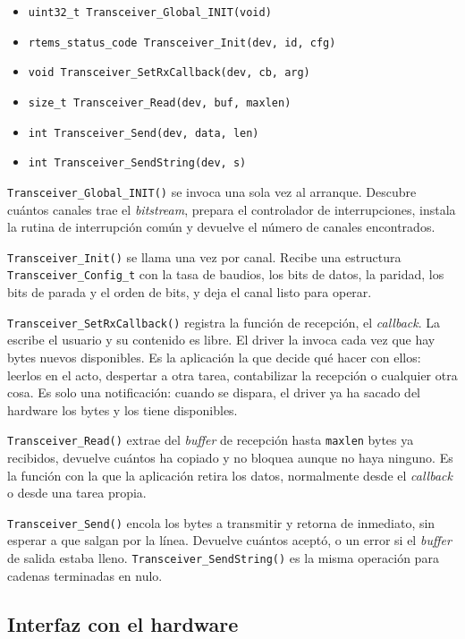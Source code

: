 \begin{itemize}
    \item \texttt{uint32\_t Transceiver\_Global\_INIT(void)}
    \item \texttt{rtems\_status\_code Transceiver\_Init(dev, id, cfg)}
    \item \texttt{void Transceiver\_SetRxCallback(dev, cb, arg)}
    \item \texttt{size\_t Transceiver\_Read(dev, buf, maxlen)}
    \item \texttt{int Transceiver\_Send(dev, data, len)}
    \item \texttt{int Transceiver\_SendString(dev, s)}
\end{itemize}

\texttt{Transceiver\_Global\_INIT()} se invoca una sola vez al arranque. Descubre cuántos canales
trae el \textit{bitstream}, prepara el controlador de interrupciones, instala la rutina de
interrupción común y devuelve el número de canales encontrados.

\texttt{Transceiver\_Init()} se llama una vez por canal. Recibe una estructura
\texttt{Transceiver\_\allowbreak Config\_t} con la tasa de baudios, los bits de datos, la paridad, los bits de
parada y el orden de bits, y deja el canal listo para operar.

\texttt{Transceiver\_SetRxCallback()} registra la función de recepción, el \textit{callback}. La
escribe el usuario y su contenido es libre. El driver la invoca cada vez que hay bytes nuevos
disponibles. Es la aplicación la que decide qué hacer con ellos: leerlos en el acto, despertar a
otra tarea, contabilizar la recepción o cualquier otra cosa. Es solo una notificación: cuando se
dispara, el driver ya ha sacado del hardware los bytes y los tiene disponibles.

\texttt{Transceiver\_Read()} extrae del \textit{buffer} de recepción hasta \texttt{maxlen} bytes ya
recibidos, devuelve cuántos ha copiado y no bloquea aunque no haya ninguno. Es la función con la que
la aplicación retira los datos, normalmente desde el \textit{callback} o desde una tarea propia.

\texttt{Transceiver\_Send()} encola los bytes a transmitir y retorna de inmediato, sin esperar a que
salgan por la línea. Devuelve cuántos aceptó, o un error si el \textit{buffer} de salida estaba
lleno. \texttt{Transceiver\_SendString()} es la misma operación para cadenas terminadas en nulo.

\subsection{Interfaz con el hardware}

